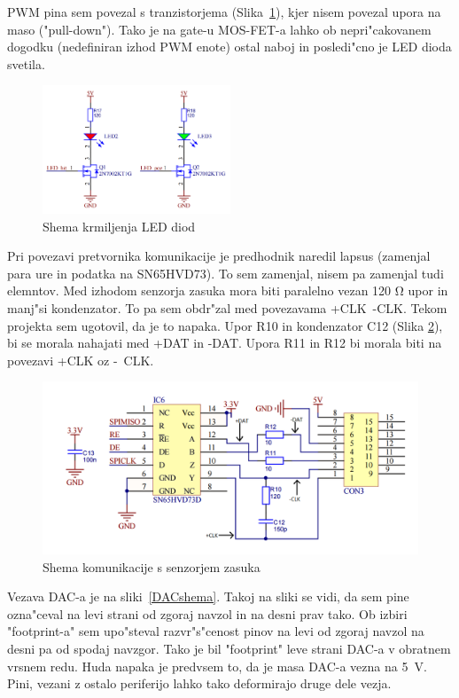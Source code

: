 \documentclass[a4paper]{article}
\begin{document}
PWM pina sem povezal s tranzistorjema (Slika~\ref{fig:LEDshema}), kjer nisem povezal upora na maso ("pull-down"). Tako je na gate-u MOS-FET-a lahko ob nepri"cakovanem dogodku (nedefiniran izhod PWM enote) ostal naboj in posledi"cno je LED dioda svetila.

	\begin{figure}[h!]
		\centering
		\includegraphics[width=0.5\textwidth ]{LED.png}
		\caption{Shema krmiljenja LED diod}
		 \label{fig:LEDshema}
	\end{figure}
Pri povezavi pretvornika komunikacije je predhodnik naredil lapsus (zamenjal para ure in podatka na SN65HVD73). To sem zamenjal, nisem pa zamenjal tudi elemntov. Med izhodom senzorja zasuka mora biti paralelno vezan 120 $\mathrm{\Omega}$ upor in manj"si kondenzator. To pa sem obdr"zal med povezavama +CLK~-CLK. Tekom projekta sem ugotovil, da je to napaka. Upor R10 in kondenzator C12 (Slika \ref{SPIshema}), bi se morala nahajati med +DAT in -DAT. Upora R11 in R12 bi morala biti na povezavi +CLK oz -~CLK.

	\begin{figure}[h!]
		\centering
		\includegraphics[width=\textwidth]{SPI_interface.png}
		\caption{Shema komunikacije s senzorjem zasuka}
		\label{SPIshema}
	\end{figure}
Vezava DAC-a je na sliki~\ref{DACshema}. Takoj na sliki se vidi, da sem pine ozna"ceval na levi strani od zgoraj navzol in na desni prav tako. Ob izbiri
"\mbox{footprint-a}" sem upo"steval razvr"s"cenost pinov na levi od zgoraj navzol na desni pa od spodaj navzgor. Tako je bil "footprint" leve strani DAC-a v obratnem vrsnem redu. Huda napaka je predvsem to, da je masa DAC-a vezna na 5~V. Pini, vezani z ostalo periferijo lahko tako deformirajo druge dele vezja.
\end{document}
